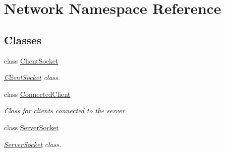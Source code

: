 \hypertarget{namespace_network}{}\section{Network Namespace Reference}
\label{namespace_network}
\subsection*{Classes}
\begin{DoxyCompactItemize}
\item 
class \hyperlink{class_network_1_1_client_socket}{Client\+Socket}
\begin{DoxyCompactList}\small\item\em \hyperlink{class_network_1_1_client_socket}{Client\+Socket} class. \end{DoxyCompactList}\item 
class \hyperlink{class_network_1_1_connected_client}{Connected\+Client}
\begin{DoxyCompactList}\small\item\em Class for clients connected to the server. \end{DoxyCompactList}\item 
class \hyperlink{class_network_1_1_server_socket}{Server\+Socket}
\begin{DoxyCompactList}\small\item\em \hyperlink{class_network_1_1_server_socket}{Server\+Socket} class. \end{DoxyCompactList}\end{DoxyCompactItemize}
